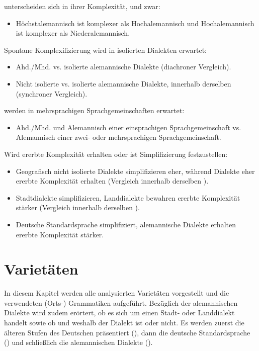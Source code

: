 \noindent
{} unterscheiden sich in ihrer Komplexität, und zwar:
\begin{itemize}
\item Höchstalemannisch ist komplexer als Hochalemannisch und Hochalemannisch ist komplexer als Niederalemannisch.
\end{itemize}

\noindent
Spontane Komplexifizierung wird in isolierten Dialekten erwartet:
\begin{itemize}
\item Ahd./Mhd. vs. isolierte alemannische Dialekte (diachroner Vergleich).
\item Nicht isolierte vs. isolierte alemannische Dialekte, innerhalb derselben  (synchroner Vergleich).
\end{itemize}

\noindent
{} werden in mehrsprachigen Sprachgemeinschaften erwartet:
\begin{itemize}
\item Ahd./Mhd. und Alemannisch einer einsprachigen Sprachgemeinschaft vs. Alemannisch einer zwei- oder mehrsprachigen Sprachgemeinschaft.
\end{itemize}

\noindent
Wird ererbte Komplexität erhalten oder ist Simplifizierung festzustellen:
\begin{itemize}
\item Geografisch nicht isolierte Dialekte simplifizieren eher, während  Dialekte eher ererbte Komplexität erhalten (Vergleich innerhalb derselben ).
\item Stadtdialekte simplifizieren, Landdialekte bewahren ererbte Komplexität stärker (Vergleich innerhalb derselben ).
\item Deutsche Standardsprache simplifiziert, alemannische Dialekte erhalten ererbte Komplexität stärker.
\end{itemize}

\section{Varietäten}\label{3.3}

In diesem Kapitel werden alle analysierten Varietäten vorgestellt und die verwendeten (Orts-) Grammatiken aufgeführt. Bezüglich der alemannischen Dialekte wird zudem erörtert, ob es sich um einen Stadt- oder Landdialekt handelt sowie ob und weshalb der Dialekt  ist oder nicht. Es werden zuerst die älteren Stufen des Deutschen präsentiert (), dann die deutsche Standardsprache () und schließlich die alemannischen Dialekte ().

